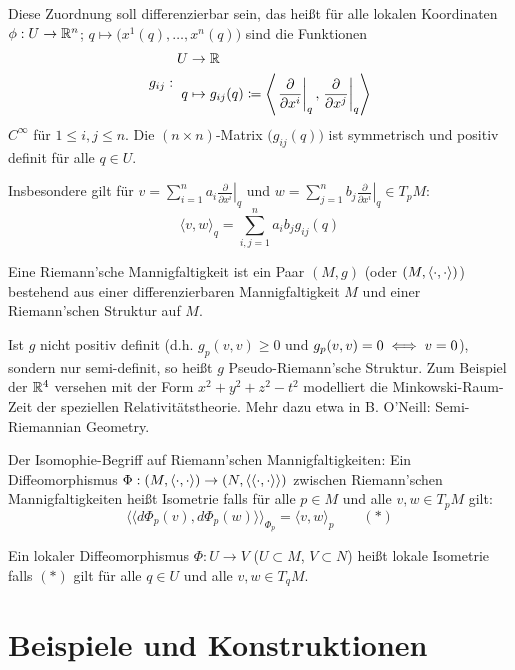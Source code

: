\documentclass[a4paper,twoside,DIV15,BCOR12mm]{scrbook}
\renewcommand{\da}{\coloneqq}
\begin{document}
Diese Zuordnung soll differenzierbar sein, das heißt für alle lokalen Koordinaten $\phi: U \to \mathbb{R}^n$; $q\mapsto \big(x^1(q), \ldots, x^n(q)\big)$ sind die Funktionen 
\[
g_{ij}:
\begin{aligned}
U &\to \MdR \\
q &\mapsto g_{ij}(q) \da \left\langle \left.\frac\partial{\partial x^i}\right|_q, \left.\frac\partial{\partial x^j}\right|_q\right\rangle
\end{aligned}
\]
$C^\infty$ für $1\le i,j\le n$. Die $(n\times n)$-Matrix $\big( g_{ij}(q)\big)$ ist symmetrisch und positiv definit für alle $q\in  U$.

Insbesondere gilt für $v = \sum_{i=1}^n a_i \left.\frac\partial{\partial x^i}\right|_q$ und $w = \sum_{j=1}^n b_j \left.\frac\partial{\partial x^i}\right|_q \in T_pM$:
\[ \langle v,w\rangle_q = \sum_{i,j=1}^n a_i b_j g_{ij}(q) \]

\begin{definition}
Eine Riemann’sche Mannigfaltigkeit ist ein Paar $(M,g)$ (oder $(M,\langle\cdot,\cdot\rangle)$) bestehend aus einer differenzierbaren Mannigfaltigkeit $M$ und einer Riemann’schen Struktur auf $M$.
\end{definition}

\begin{bemerkung}
Ist $g$ nicht positiv definit (d.h. $g_p(v,v)\ge 0$ und $g_p(v,v) = 0 \iff v=0$), sondern nur semi-definit, so heißt $g$ Pseudo-Riemann’sche Struktur. Zum Beispiel der $\mathbb{R}^4$ versehen mit der Form $x^2 + y^2 + z^2 - t^2$ modelliert die Minkowski-Raum-Zeit der speziellen Relativitätstheorie. Mehr dazu etwa in B. O’Neill: Semi-Riemannian Geometry.
\end{bemerkung}

Der Isomophie-Begriff auf Riemann’schen Mannigfaltigkeiten: Ein Diffeomorphismus $\Phi: (M,\langle\cdot,\cdot\rangle) \to (N,\langle\langle\cdot,\cdot\rangle\rangle)$ zwischen Riemann’schen Mannigfaltigkeiten heißt Isometrie falls für alle $p\in M$ und alle $v,w\in T_pM$ gilt:
\[ \langle\langle d\Phi_p(v), d\Phi_p(w) \rangle\rangle_{\Phi_{p}} = \langle v,w\rangle_p \qquad (*) \]

Ein lokaler Diffeomorphismus $\Phi: U \to V$ ($U\subset M$, $V\subset N$) heißt lokale Isometrie falls $(*)$ gilt für alle $q\in U$ und alle $v,w \in T_qM$.


\section{Beispiele und Konstruktionen}
\end{document}
